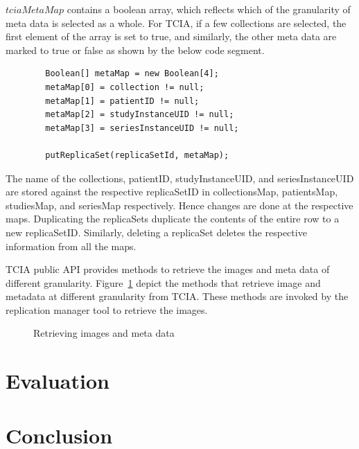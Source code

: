 \documentclass[conference]{IEEEtran}
\begin{document}
$tciaMetaMap$ contains a boolean array, which reflects which of the granularity of meta data is selected as a whole. For TCIA, if a few collections are selected, the first element of the array is set to true, and similarly, the other meta data are marked to true or false as shown by the below code segment.
\begin{lstlisting}  
        Boolean[] metaMap = new Boolean[4];
        metaMap[0] = collection != null;
        metaMap[1] = patientID != null;
        metaMap[2] = studyInstanceUID != null;
        metaMap[3] = seriesInstanceUID != null;

        putReplicaSet(replicaSetId, metaMap);
\end{lstlisting} 
The name of the collections, patientID, studyInstanceUID, and seriesInstanceUID are stored against the respective replicaSetID in collectionsMap, patientsMap, studiesMap, and seriesMap respectively. Hence changes are done at the respective maps. Duplicating the replicaSets duplicate the contents of the entire row to a new replicaSetID. Similarly, deleting a replicaSet deletes the respective information from all the maps.

TCIA public API provides methods to retrieve the images and meta data of different granularity. Figure~\ref{fig:methods} depict the methods that retrieve image and metadata at different granularity from TCIA. These methods are invoked by the replication manager tool to retrieve the images.
\begin{figure}[htbp]
\begin{center}
\end{center}
 \caption{Retrieving images and meta data}
 \label{fig:methods}
\end{figure}


\section{Evaluation}
\section{Conclusion}
\balance

\end{document}
